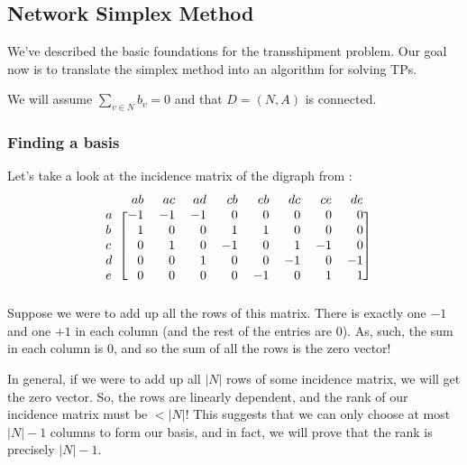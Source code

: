 \subsection{Network Simplex Method}
We've described the basic foundations for the transshipment problem. Our goal now is to translate the simplex method into an algorithm for solving TPs.

\begin{remark}
We will assume $\sum_{v \in N} b_v = 0$ and that $D = (N,A)$ is connected.
\end{remark}

\subsubsection{Finding a basis}

Let's take a look at the incidence matrix of the digraph from :
\[
  \begin{blockarray}{rrrrrrrrr}
      & ab & ac & ad & cb & eb & dc & ce & de \\
  \begin{block}{l[rrrrrrrr]}
    a & -1 & -1 & -1 &  0 &  0 &  0 &  0 &  0 \\
    b &  1 &  0 &  0 &  1 &  1 &  0 &  0 &  0 \\
    c &  0 &  1 &  0 & -1 &  0 &  1 & -1 &  0 \\
    d &  0 &  0 &  1 &  0 &  0 & -1 &  0 & -1 \\
    e &  0 &  0 &  0 &  0 & -1 &  0 &  1 &  1 \\
  \end{block}
  \end{blockarray}
\]
Suppose we were to add up all the rows of this matrix. There is exactly one $-1$ and one $+1$ in each column (and the rest of the entries are $0$). As, such, the sum in each column is $0$, and so the sum of all the rows is the zero vector!

In general, if we were to add up all $|N|$ rows of some incidence matrix, we will get the zero vector. So, the rows are linearly dependent, and the rank of our incidence matrix must be $< |N|$!
This suggests that we can only choose at most $|N| - 1$ columns to form our basis, and in fact, we will prove that the rank is precisely $|N| - 1$.


